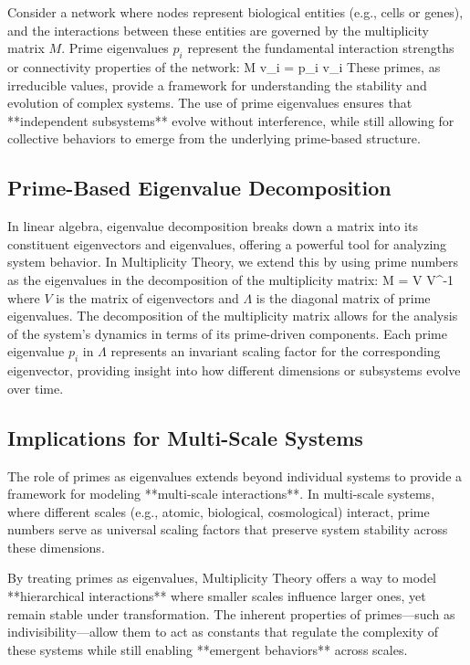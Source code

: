 \documentclass[12pt]{article}
\begin{document}
Consider a network where nodes represent biological entities (e.g., cells or genes), and the interactions between these entities are governed by the multiplicity matrix \( M \). Prime eigenvalues \( p_i \) represent the fundamental interaction strengths or connectivity properties of the network:
\]
M v_i = p_i v_i
\]
These primes, as irreducible values, provide a framework for understanding the stability and evolution of complex systems. The use of prime eigenvalues ensures that **independent subsystems** evolve without interference, while still allowing for collective behaviors to emerge from the underlying prime-based structure.

\subsection{Prime-Based Eigenvalue Decomposition}

In linear algebra, eigenvalue decomposition breaks down a matrix into its constituent eigenvectors and eigenvalues, offering a powerful tool for analyzing system behavior. In Multiplicity Theory, we extend this by using prime numbers as the eigenvalues in the decomposition of the multiplicity matrix:
\]
M = V \Lambda V^{-1}
\]
where \( V \) is the matrix of eigenvectors and \( \Lambda \) is the diagonal matrix of prime eigenvalues. The decomposition of the multiplicity matrix allows for the analysis of the system's dynamics in terms of its prime-driven components. Each prime eigenvalue \( p_i \) in \( \Lambda \) represents an invariant scaling factor for the corresponding eigenvector, providing insight into how different dimensions or subsystems evolve over time.

\subsection{Implications for Multi-Scale Systems}

The role of primes as eigenvalues extends beyond individual systems to provide a framework for modeling **multi-scale interactions**. In multi-scale systems, where different scales (e.g., atomic, biological, cosmological) interact, prime numbers serve as universal scaling factors that preserve system stability across these dimensions.

By treating primes as eigenvalues, Multiplicity Theory offers a way to model **hierarchical interactions** where smaller scales influence larger ones, yet remain stable under transformation. The inherent properties of primes—such as indivisibility—allow them to act as constants that regulate the complexity of these systems while still enabling **emergent behaviors** across scales.
\end{document}
